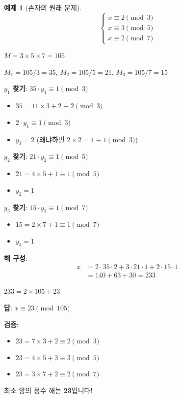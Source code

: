\documentclass[11pt,a4paper]{article}
\theoremstyle{definition}
\newtheorem{example}[theorem]{예제}
\theoremstyle{remark}
\begin{document}
\begin{example}[손자의 원래 문제]
\[\begin{cases}
x \equiv 2 \pmod{3} \\
x \equiv 3 \pmod{5} \\
x \equiv 2 \pmod{7}
\end{cases}\]

$M = 3 \times 5 \times 7 = 105$

$M_1 = 105/3 = 35$, $M_2 = 105/5 = 21$, $M_3 = 105/7 = 15$

\textbf{$y_1$ 찾기}: $35 \cdot y_1 \equiv 1 \pmod{3}$
\begin{itemize}
    \item $35 = 11 \times 3 + 2 \equiv 2 \pmod{3}$
    \item $2 \cdot y_1 \equiv 1 \pmod{3}$
    \item $y_1 = 2$ (왜냐하면 $2 \times 2 = 4 \equiv 1 \pmod{3}$)
\end{itemize}

\textbf{$y_2$ 찾기}: $21 \cdot y_2 \equiv 1 \pmod{5}$
\begin{itemize}
    \item $21 = 4 \times 5 + 1 \equiv 1 \pmod{5}$
    \item $y_2 = 1$
\end{itemize}

\textbf{$y_3$ 찾기}: $15 \cdot y_3 \equiv 1 \pmod{7}$
\begin{itemize}
    \item $15 = 2 \times 7 + 1 \equiv 1 \pmod{7}$
    \item $y_3 = 1$
\end{itemize}

\textbf{해 구성}:
\begin{align*}
x &= 2 \cdot 35 \cdot 2 + 3 \cdot 21 \cdot 1 + 2 \cdot 15 \cdot 1 \\
  &= 140 + 63 + 30 = 233
\end{align*}

$233 = 2 \times 105 + 23$

\textbf{답}: $x \equiv 23 \pmod{105}$

\textbf{검증}:
\begin{itemize}
    \item $23 = 7 \times 3 + 2 \equiv 2 \pmod{3}$ \checkmark
    \item $23 = 4 \times 5 + 3 \equiv 3 \pmod{5}$ \checkmark
    \item $23 = 3 \times 7 + 2 \equiv 2 \pmod{7}$ \checkmark
\end{itemize}

최소 양의 정수 해는 \textbf{23}입니다!
\end{example}
\end{document}
